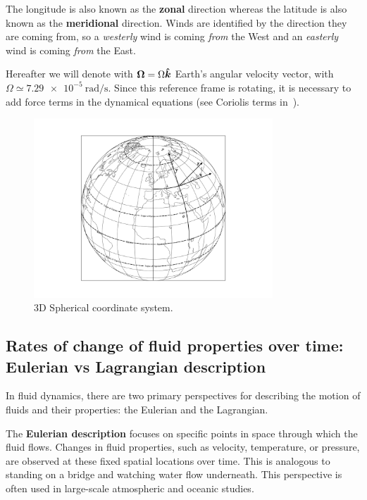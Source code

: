 The longitude is also known as the \textbf{zonal} direction whereas the
latitude is also known as the \textbf{meridional} direction.
Winds are identified by the direction they are coming from, so a \emph{westerly} wind
is coming \emph{from} the West and an \emph{easterly} wind is coming \emph {from} the
East.

Hereafter we will denote with $\vec{\Omega} = \Omega \unitv{k}$ Earth's angular velocity vector, with $\Omega \simeq \qty{7.29e-5}{\radian \per \second}$.
Since this reference frame is rotating, it is necessary to add force terms in the dynamical equations (see Coriolis terms in~\eq{\ref{eq:momentum-eq-atm}}).
\begin{figure}
	\centering
	\includegraphics[width=0.8\textwidth]{figs/3d-coordinate-sys}
	\caption{3D Spherical coordinate system.}
	\label{fig:3d-coordinate-sys}
\end{figure}

\subsection{Rates of change of fluid properties over time: Eulerian vs Lagrangian description}\label{subsec:eulerian-lagrangian-derivative}

In fluid dynamics, there are two primary perspectives for describing the motion of fluids and their properties: the Eulerian and the Lagrangian.

The \textbf{Eulerian description} focuses on specific points in space through which the fluid flows.
Changes in fluid properties, such as velocity, temperature, or pressure, are observed at these fixed spatial locations over time.
This is analogous to standing on a bridge and watching water flow underneath.
This perspective is often used in large-scale atmospheric and oceanic studies.

